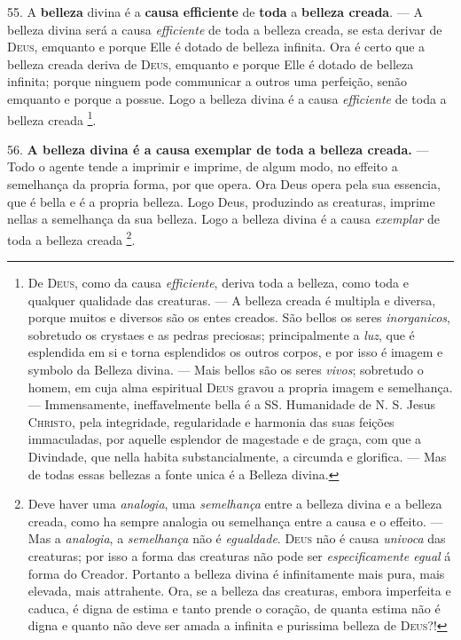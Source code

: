 55. A \textbf{belleza} divina é a \textbf{causa efficiente} de \textbf{toda} a \textbf{belleza creada}. --- A belleza divina será a causa \emph{efficiente} de toda a belleza creada, se esta derivar de \textsc{Deus}, emquanto e porque Elle é dotado de belleza infinita. Ora é certo que a belleza creada deriva de \textsc{Deus}, emquanto e porque Elle é dotado de belleza infinita; porque ninguem pode communicar a outros uma   perfeição, senão emquanto e porque a possue. Logo a belleza divina é a causa \emph{efficiente} de toda a belleza creada \footnote{De \textsc{Deus}, como da causa \emph{efficiente}, deriva toda a belleza, como toda e qualquer qualidade das creaturas. --- A belleza creada é multipla e diversa, porque muitos e diversos são os entes creados. São bellos os seres \emph{inorganicos}, sobretudo os crystaes e as pedras preciosas; principalmente a \emph{luz}, que é esplendida em si e torna esplendidos os outros corpos, e por isso é imagem e symbolo da Belleza divina. --- Mais bellos são os seres \emph{vivos}; sobretudo o homem, em cuja alma espiritual \textsc{Deus} gravou a propria imagem e semelhança. --- Immensamente, ineffavelmente bella é a SS. Humanidade de N. S. Jesus \textsc{Christo}, pela integridade, regularidade e harmonia das suas feições immaculadas, por aquelle esplendor de magestade e de graça, com que a Divindade, que nella habita substancialmente, a circumda e glorifica. --- Mas de todas essas bellezas a fonte unica é a Belleza divina.}.

56. \textbf{A belleza divina é a causa exemplar de toda a belleza creada.} --- Todo o agente tende a imprimir e imprime, de algum modo, no effeito a semelhança da propria forma, por que opera. Ora Deus opera pela sua essencia, que é bella e é a propria belleza. Logo Deus, produzindo as creaturas, imprime nellas a semelhança da sua belleza. Logo a belleza divina é a causa \emph{exemplar} de toda a belleza creada \footnote{Deve haver uma \emph{analogia}, uma \emph{semelhança} entre a belleza divina e a belleza creada, como ha sempre analogia ou semelhança entre a causa e o effeito. --- Mas a \emph{analogia}, a \emph{semelhança} não é \emph{egualdade}. \textsc{Deus} não é causa \emph{univoca} das creaturas; por isso a forma das creaturas não pode ser \emph{especificamente egual} á forma do Creador. Portanto a belleza divina é infinitamente mais pura, mais elevada, mais attrahente. Ora, se a belleza das creaturas, embora imperfeita e caduca, é digna de estima e tanto prende o coração, de quanta estima não é digna e quanto não deve ser amada a infinita e purissima belleza de \textsc{Deus}?!}.

